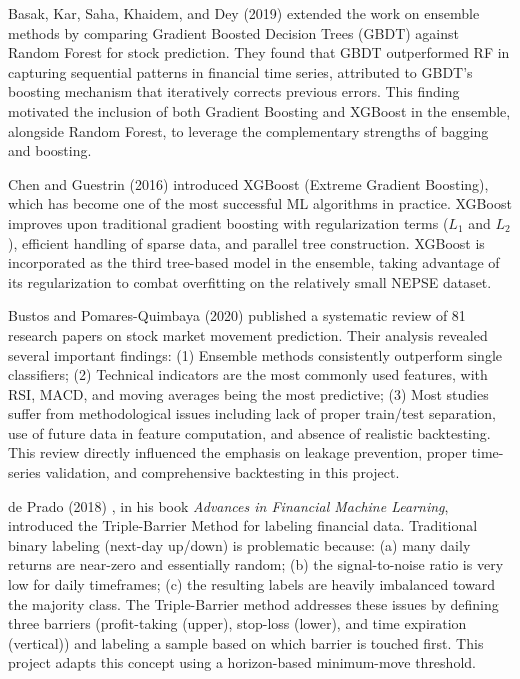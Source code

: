 \documentclass[12pt, a4paper]{report}
\begin{document}
	Basak, Kar, Saha, Khaidem, and Dey (2019) \cite{basak2019} extended the work on ensemble methods by comparing Gradient Boosted Decision Trees (GBDT) against Random Forest for stock prediction. They found that GBDT outperformed RF in capturing sequential patterns in financial time series, attributed to GBDT's boosting mechanism that iteratively corrects previous errors. This finding motivated the inclusion of both Gradient Boosting and XGBoost in the ensemble, alongside Random Forest, to leverage the complementary strengths of bagging and boosting.
	
	Chen and Guestrin (2016) \cite{chen2016} introduced XGBoost (Extreme Gradient Boosting), which has become one of the most successful ML algorithms in practice. XGBoost improves upon traditional gradient boosting with regularization terms ($L_1$ and $L_2$), efficient handling of sparse data, and parallel tree construction. XGBoost is incorporated as the third tree-based model in the ensemble, taking advantage of its regularization to combat overfitting on the relatively small NEPSE dataset.
	
	Bustos and Pomares-Quimbaya (2020) \cite{bustos2020} published a systematic review of 81 research papers on stock market movement prediction. Their analysis revealed several important findings: (1) Ensemble methods consistently outperform single classifiers; (2) Technical indicators are the most commonly used features, with RSI, MACD, and moving averages being the most predictive; (3) Most studies suffer from methodological issues including lack of proper train/test separation, use of future data in feature computation, and absence of realistic backtesting. This review directly influenced the emphasis on leakage prevention, proper time-series validation, and comprehensive backtesting in this project.
	
	de Prado (2018) \cite{deprado2018}, in his book \textit{Advances in Financial Machine Learning}, introduced the Triple-Barrier Method for labeling financial data. Traditional binary labeling (next-day up/down) is problematic because: (a) many daily returns are near-zero and essentially random; (b) the signal-to-noise ratio is very low for daily timeframes; (c) the resulting labels are heavily imbalanced toward the majority class. The Triple-Barrier method addresses these issues by defining three barriers (profit-taking (upper), stop-loss (lower), and time expiration (vertical)) and labeling a sample based on which barrier is touched first. This project adapts this concept using a horizon-based minimum-move threshold.
	
\end{document}
